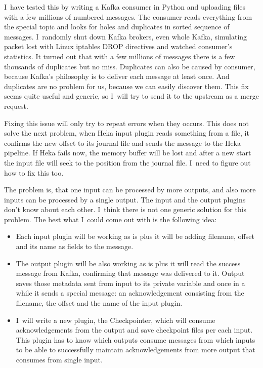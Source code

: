 I~have tested this by writing a Kafka consumer in Python and uploading files with a few millions of numbered messages. The consumer reads everything from the special topic and looks for holes and duplicates in sorted sequence of messages. I~randomly shut down Kafka brokers, even whole Kafka, simulating packet lost with Linux iptables DROP directives and watched consumer’s statistics. It turned out that with a few millions of messages there is a few thousands of duplicates but no miss. Duplicates can also be caused by consumer, because Kafka’s philosophy is to deliver each message at least once. And duplicates are no problem for us, because we can easily discover them. This fix seems quite useful and generic, so I~will try to send it to the upstream as a merge request.

Fixing this issue will only try to repeat errors when they occurs. This does not solve the next problem, when Heka input plugin reads something from a file, it confirms the new offset to its journal file and sends the message to the Heka pipeline. If Heka fails now, the memory buffer will be lost and after a new start the input file will seek to the position from the journal file. I~need to figure out how to fix this too. 

The problem is, that one input can be processed by more outputs, and also more inputs can be processed by a single output. The input and the output plugins don’t know about each other. I~think there is not one generic solution for this problem. The best what I~could come out with is the following idea:

\begin{itemize}
  \item Each input plugin will be working as is plus it will be adding filename, offset and its name as fields to the message. 
  \item The output plugin will be also working as is plus it will read the success message from Kafka, confirming that message was delivered to it. Output saves those metadata sent from input to its private variable and once in a while it sends a special message: an acknowledgement consisting from the filename, the offset and the name of the input plugin.
  \item I~will write a new plugin, the Checkpointer, which will consume acknowledgements from the output and save checkpoint files per each input. This plugin has to know which outputs consume messages from which inputs to be able to successfully maintain acknowledgements from more output that consumes from single input.
\end{itemize}

